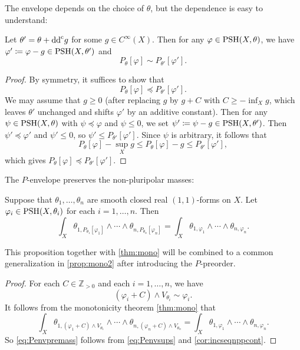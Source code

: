 The envelope depends on the choice of $\theta$, but the dependence is easy to understand:
\begin{proposition}\label{prop:Penvindeptheta}
    Let $\theta'=\theta+\mathrm{dd}^{\mathrm{c}} g$ for some $g\in C^{\infty}(X)$. Then for any $\varphi\in \mathrm{PSH}(X,\theta)$, we have $\varphi'\coloneqq \varphi-g\in \mathrm{PSH}(X,\theta')$ and
    \[
        P_{\theta}[\varphi]\sim P_{\theta'}[\varphi'].
    \]
\end{proposition}
\begin{proof}
    By symmetry, it suffices to show that
    \[
        P_{\theta}[\varphi]\preceq P_{\theta'}[\varphi'].
    \]
    We may assume that $g\geq 0$ (after replacing $g$ by $g+C$ with $C\geq -\inf_X g$, which leaves $\theta'$ unchanged and shifts $\varphi'$ by an additive constant).
    Then for any $\psi\in \mathrm{PSH}(X,\theta)$ with $\psi\preceq \varphi$ and $\psi\leq 0$, we set $\psi'\coloneqq \psi-g\in \mathrm{PSH}(X,\theta')$. Then $\psi'\preceq \varphi'$ and $\psi'\leq 0$, so $\psi'\leq P_{\theta'}[\varphi']$. Since $\psi$ is arbitrary, it follows that
    \[
        P_{\theta}[\varphi]-\sup_X g\leq P_{\theta}[\varphi]-g\leq P_{\theta'}[\varphi'],
    \]
    which gives $P_{\theta}[\varphi]\preceq P_{\theta'}[\varphi']$.
\end{proof}

The $P$-envelope preserves the non-pluripolar masses:
\begin{proposition}\label{prop:Ppresmass}
Suppose that $\theta_1,\ldots,\theta_n$ are smooth closed real $(1,1)$-forms on $X$. Let $\varphi_i\in \mathrm{PSH}(X,\theta_i)$ for each $i=1,\ldots,n$. Then
\begin{equation}\label{eq:Penvpremass}
\int_X \theta_{1,P_{\theta_1}[\varphi_1]}\wedge \cdots \wedge \theta_{n,P_{\theta_n}[\varphi_n]}=\int_X \theta_{1,\varphi_1}\wedge \cdots\wedge \theta_{n,\varphi_n}.
\end{equation}
\end{proposition}
This proposition together with \cref{thm:mono} will be combined to a common generalization in \cref{prop:mono2} after introducing the $P$-preorder.
\begin{proof}
For each $C\in \mathbb{Z}_{>0}$ and each $i=1,\ldots,n$, we have
\[
(\varphi_i+C)\land V_{\theta_i}\sim \varphi_i.
\]
It follows from the monotonicity theorem \cref{thm:mono} that
\[
\int_X \theta_{1,(\varphi_1+C)\land V_{\theta_1}}\wedge \cdots \wedge \theta_{n,(\varphi_n+C)\land V_{\theta_n}}=\int_X \theta_{1,\varphi_1}\wedge \cdots\wedge \theta_{n,\varphi_n}.
\]
So \eqref{eq:Penvpremass} follows from \eqref{eq:Penvsups} and \cref{cor:incseqnppcont}.
\end{proof}

